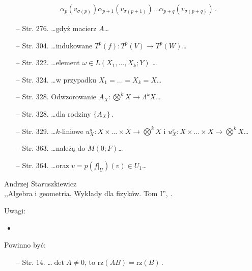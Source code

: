 \begin{itemize}
\begin{displaymath}
\begin{split}
      \alpha_{ p } ( v_{ \sigma ( p ) } ) \alpha_{ p + 1 } ( v_{
        \sigma( p + 1 ) } ) \ldots \alpha_{ p + q } ( v_{ \sigma ( p +
        q ) } ) \, .
    \end{split}
  \end{displaymath}
\item[--] Str. 276. \ldots gdyż macierz $A$\ldots
\item[--] Str. 304. \ldots indukowane $T^{ p } ( f ) : T^{ p } ( V )
  \rightarrow T^{ p } (W)$\ldots
\item[--] Str. 322. \ldots element $\omega \in L( X_{ 1 } ,\ldots, X_{
    k }; Y )$ \ldots
\item[--] Str. 324. \ldots w przypadku $X_{ 1 } = \ldots = X_{ k } =
  X$\ldots
\item[--] Str. 328. Odwzorowanie $A_{ X } : \bigotimes^{ k } X
  \rightarrow \Lambda^{ k } X$\ldots
\item[--] Str. 328. \ldots dla rodziny $\{ A_{ X } \} \, .$
\item[--] Str. 329. \ldots $k$-liniowe $u^{ a }_{ X } : X \times
  \ldots \times X \rightarrow \bigotimes^{ k } X$ i $u^{ s }_{ X } : X
  \times \ldots \times X \rightarrow \bigotimes^{ k } X$\ldots
\item[--] Str. 363. \ldots należą do $M( 0; F )$\ldots
\item[--] Str. 364. \ldots oraz $v = p( f |_{ U } ) ( v ) \in U_{ 1
  }$\ldots
\end{itemize}



\begin{center}
  Andrzej Staruszkiewicz \\
  ,,Algebra i geometria. Wykłady dla fizyków. Tom I'', \cite{ASAG}.
\end{center}


Uwagi:
\begin{itemize}
\item
\end{itemize}


Powinno być:
\begin{itemize}
\item[--] Str. 14. \ldots $\det A \neq 0$, to $\textrm{rz} ( AB ) =
  \textrm{rz} ( B ) \, .$
\end{itemize}

